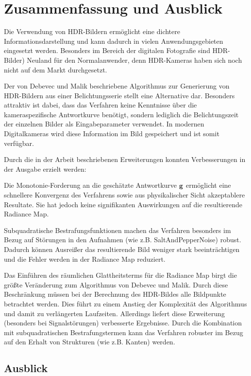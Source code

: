 \chapter{Zusammenfassung und Ausblick}
\label{chap:zusfas}
Die Verwendung von \gls{HDR}-Bildern ermöglicht eine dichtere Informationsdarstellung und kann dadurch in vielen Anwendungsgebieten eingesetzt werden. Besonders im Bereich der digitalen Fotografie sind \gls{HDR}-Bilder) Neuland für den Normalanwender, denn HDR-Kameras haben sich noch nicht auf dem Markt durchgesetzt. 

Der von Debevec und Malik beschriebene Algorithmus \cite{paper} zur Generierung von \gls{HDR}-Bildern aus einer Belichtungsserie stellt eine Alternative dar. Besonders attraktiv ist dabei, dass das Verfahren keine Kenntnisse über die kameraspezifische Antwortkurve benötigt, sondern lediglich die Belichtungszeit der einzelnen Bilder als Eingabeparameter verwendet. In modernen Digitalkameras wird diese Information im Bild gespeichert und ist somit verfügbar.

Durch die in der Arbeit beschriebenen Erweiterungen konnten Verbesserungen in der Ausgabe erzielt werden:

Die Monotonie-Forderung an die geschätzte Antwortkurve $\mathbf g$ ermöglicht eine schnellere Konvergenz des Verfahrens sowie aus physikalischer Sicht akzeptablere Resultate. Sie hat jedoch keine signifikanten Auswirkungen auf die resultierende \gls{Radiance Map}. 

Subquadratische Bestrafungsfunktionen machen das Verfahren besonders im Bezug auf Störungen in den Aufnahmen (wie z.B. \gls{SaltAndPepperNoise}) robust. Dadurch können Ausreißer das resultierende Bild weniger stark beeinträchtigen und die Fehler werden in der \gls{Radiance Map} reduziert.

Das Einführen des räumlichen Glattheitsterms für die \gls{Radiance Map} birgt die größte Veränderung zum Algorithmus von Debevec und Malik. Durch diese Beschränkung müssen bei der Berechnung des \gls{HDR}-Bildes alle Bildpunkte betrachtet werden. Dies führt zu einem Anstieg der Komplexität des Algorithmus und damit zu verlängerten Laufzeiten. Allerdings liefert diese Erweiterung (besonders bei Signalstörungen) verbesserte Ergebnisse. Durch die Kombination mit subquadratischen Bestrafungstermen kann das Verfahren robuster im Bezug auf den Erhalt von Strukturen (wie z.B. Kanten) werden.



\section*{Ausblick}



